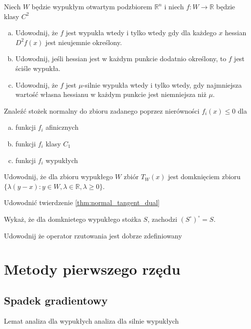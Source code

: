 \documentclass[10pt,a4paper,draft]{report}
\begin{document}
\begin{problem}
Niech $W$ będzie wypukłym otwartym podzbiorem $\mathbb{R}^n$ i niech $f : W \rightarrow \mathbb{R}$ będzie klasy $C^2$
\begin{enumerate}[a)]
\item Udowodnij, że $f$ jest wypukła wtedy i tylko wtedy gdy dla każdego $x$ hessian $D^2 f(x)$ jest nieujemnie określony.
\item Udowodnij, jeśli hessian jest w każdym punkcie dodatnio określony, to $f$ jest ściśle wypukła.
\item Udowodnij, że $f$ jest $\mu$-silnie wypukła wtedy i tylko wtedy, gdy najmniejsza wartość własna hessianu w każdym punkcie jest niemniejsza niż $\mu$.
\end{enumerate}
\end{problem}




\begin{problem}
Znaleźć stożek normalny do zbioru zadanego poprzez nierówności $f_i(x) \leq 0$ dla
\begin{enumerate}[a)]
\item funkcji $f_i$ afinicznych
\item funkcji $f_i$ klasy $C_1$
\item funkcji $f_i$ wypukłych
\end{enumerate}

\end{problem}
\begin{problem}
Udowodnij, że dla zbioru wypukłego $W$ zbiór $T_W(x)$ jest domknięciem zbioru $\{ \lambda(y - x) : y \in W, \lambda \in \mathbb{R}, \lambda \geq 0\}$. 
\end{problem}
\begin{problem}
Udowodnić twierdzenie \ref{thm:normal_tangent_dual}
\end{problem}
\begin{problem}
Wykaż, że dla domknietego wypukłego stożka $S$, zachodzi $(S^{\circ})^{\circ} = S$.
\end{problem}
\begin{problem}
Udowodnij że operator rzutowania jest dobrze zdefiniowany
\end{problem}




\chapter{Metody pierwszego rzędu}
\section{Spadek gradientowy}
Lemat
analiza dla wypukłych
analiza dla silnie wypukłych
\end{document}
